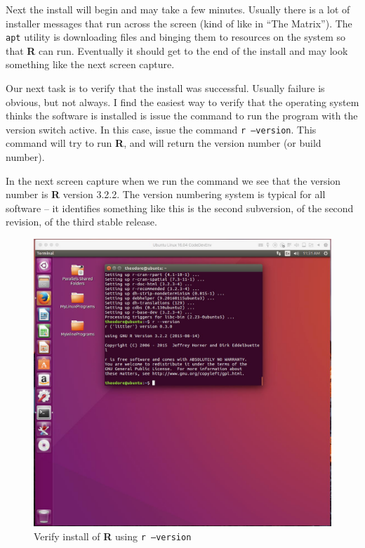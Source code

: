 Next the install will begin and may take a few minutes.  
Usually there is a lot of installer messages that run across the screen (kind of like in ``The Matrix'').
The \texttt{apt} utility is downloading files and binging them to resources on the system so that \textbf{R} can run.
Eventually it should get to the end of the install and may look something like the next screen capture.

Our next task is to verify that the install was successful.
Usually failure is obvious, but not always.
I find the easiest way to verify that the operating system thinks the software is installed is issue the command to run the program with the version switch active.
In this case, issue the command \texttt{r --version}.
This command will try to run \textbf{R}, and will return the version number (or build number). 

In the next screen capture when we run the command we see that the version number is \textbf{R} version 3.2.2.
The version numbering system is typical for all software -- it identifies something like this is the second subversion, of the second revision, of the third stable release. 

\begin{figure}[h!] %
   \centering
   \includegraphics[width=5in]{./1-Introduction/LinuxRVersion.jpg} 
   \caption{Verify install of \textbf{R} using \texttt{r --version}}
\end{figure}

